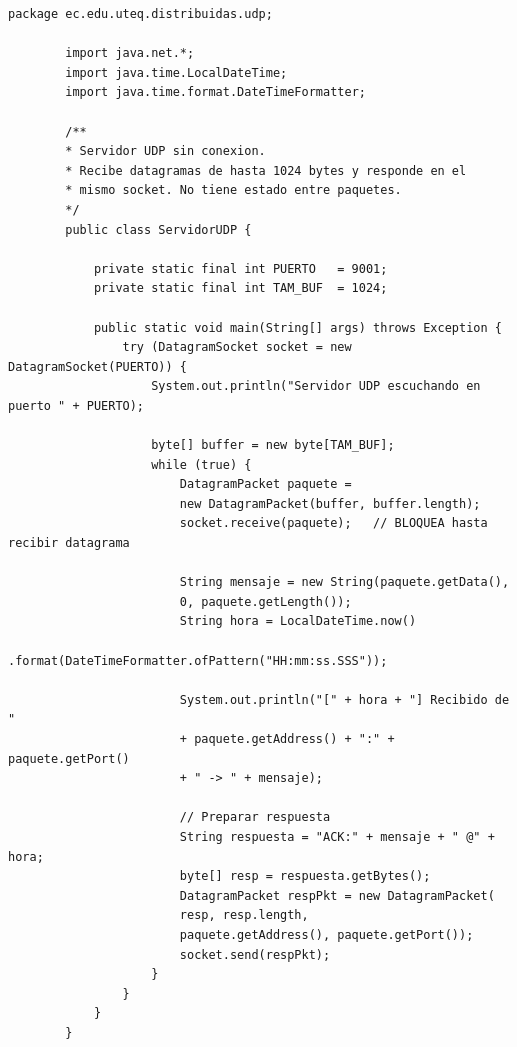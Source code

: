 \documentclass[12pt, a4paper, openany]{book}
\begin{document}
	\begin{lstlisting}[style=JavaStyle, caption={ServidorUDP.java --- Servidor sin conexión}]
		package ec.edu.uteq.distribuidas.udp;
		
		import java.net.*;
		import java.time.LocalDateTime;
		import java.time.format.DateTimeFormatter;
		
		/**
		* Servidor UDP sin conexion.
		* Recibe datagramas de hasta 1024 bytes y responde en el
		* mismo socket. No tiene estado entre paquetes.
		*/
		public class ServidorUDP {
			
			private static final int PUERTO   = 9001;
			private static final int TAM_BUF  = 1024;
			
			public static void main(String[] args) throws Exception {
				try (DatagramSocket socket = new DatagramSocket(PUERTO)) {
					System.out.println("Servidor UDP escuchando en puerto " + PUERTO);
					
					byte[] buffer = new byte[TAM_BUF];
					while (true) {
						DatagramPacket paquete =
						new DatagramPacket(buffer, buffer.length);
						socket.receive(paquete);   // BLOQUEA hasta recibir datagrama
						
						String mensaje = new String(paquete.getData(),
						0, paquete.getLength());
						String hora = LocalDateTime.now()
						.format(DateTimeFormatter.ofPattern("HH:mm:ss.SSS"));
						
						System.out.println("[" + hora + "] Recibido de "
						+ paquete.getAddress() + ":" + paquete.getPort()
						+ " -> " + mensaje);
						
						// Preparar respuesta
						String respuesta = "ACK:" + mensaje + " @" + hora;
						byte[] resp = respuesta.getBytes();
						DatagramPacket respPkt = new DatagramPacket(
						resp, resp.length,
						paquete.getAddress(), paquete.getPort());
						socket.send(respPkt);
					}
				}
			}
		}
	\end{lstlisting}
	
\end{document}
